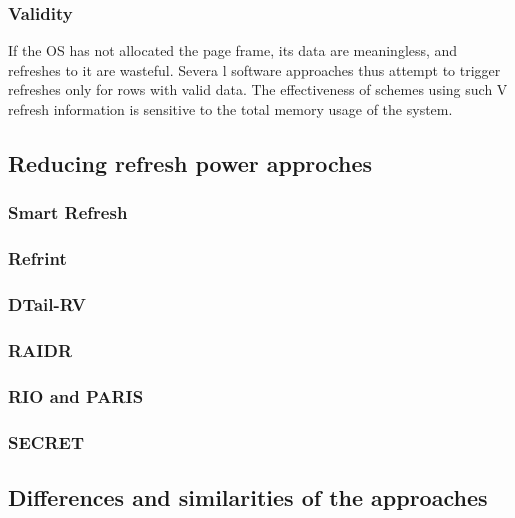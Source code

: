\subsubsection*{\textbf{Validity}}
If the OS has not allocated the page frame, its data are meaningless, and refreshes to it are wasteful. Severa
l software approaches thus attempt to trigger refreshes only for rows with valid data. The effectiveness of schemes using such V refresh information is sensitive to the total memory usage of the system.

\subsection{Reducing refresh power approches}


\subsubsection*{\textbf{Smart Refresh}}
\label{par:smartrefresh}


\subsubsection*{\textbf{Refrint}}
\label{par:refrint}


\subsubsection*{\textbf{DTail-RV}}
\label{par:dtail}


\subsubsection*{\textbf{RAIDR}}
\label{par:raidr}


\subsubsection*{\textbf{RIO and PARIS}}
\label{par:rioparis}


\subsubsection*{\textbf{SECRET}}
\label{par:secret}



\subsection{Differences and similarities of the approaches}